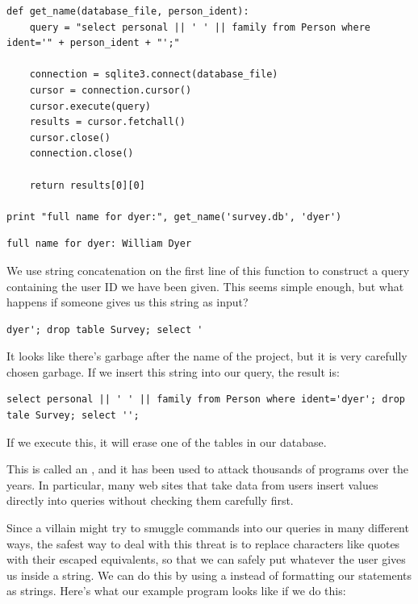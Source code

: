 \documentclass{book}
\begin{document}
\begin{verbatim}
def get_name(database_file, person_ident):
    query = "select personal || ' ' || family from Person where ident='" + person_ident + "';"

    connection = sqlite3.connect(database_file)
    cursor = connection.cursor()
    cursor.execute(query)
    results = cursor.fetchall()
    cursor.close()
    connection.close()

    return results[0][0]

print "full name for dyer:", get_name('survey.db', 'dyer')
\end{verbatim}

\begin{verbatim}
full name for dyer: William Dyer
\end{verbatim}

We use string concatenation on the first line of this function to
construct a query containing the user ID we have been given. This seems
simple enough, but what happens if someone gives us this string as
input?

\begin{verbatim}
dyer'; drop table Survey; select '
\end{verbatim}

It looks like there's garbage after the name of the project, but it is
very carefully chosen garbage. If we insert this string into our query,
the result is:

\begin{verbatim}
select personal || ' ' || family from Person where ident='dyer'; drop tale Survey; select '';
\end{verbatim}

If we execute this, it will erase one of the tables in our database.

This is called an , and it has been used to attack thousands of programs over the
years. In particular, many web sites that take data from users insert
values directly into queries without checking them carefully first.

Since a villain might try to smuggle commands into our queries in many
different ways, the safest way to deal with this threat is to replace
characters like quotes with their escaped equivalents, so that we can
safely put whatever the user gives us inside a string. We can do this by
using a  instead of
formatting our statements as strings. Here's what our example program
looks like if we do this:
\end{document}
